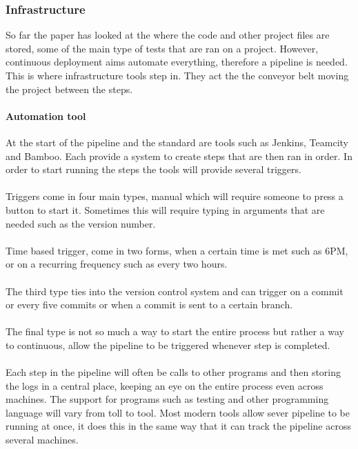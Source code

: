 \subsubsection{Infrastructure}

So far the paper has looked at the where the code and other project files are stored, some of the main type of tests that are ran on a project. However, continuous deployment aims automate everything, therefore a pipeline is needed. This is where infrastructure tools step in. They act the the conveyor belt moving the project between the steps.

\paragraph{Automation tool}
At the start of the pipeline and the standard are tools such as Jenkins, Teamcity and Bamboo. Each provide a system to create steps that are then ran in order. In order to start running the steps the tools will provide several triggers.
\\\\
Triggers come in four main types, manual which will require someone to press a button to start it. Sometimes this will require typing in arguments that are needed such as the version number. 
\\\\
Time based trigger, come in two forms, when a certain time is met such as 6PM, or on a recurring frequency such as every two hours.
\\\\
The third type ties into the version control system and can trigger on a commit or every five commits or when a commit is sent to a certain branch. 
\\\\
The final type is not so much a way to start the entire process but rather a way to continuous, allow the pipeline to be triggered whenever step is completed.
\\\\
Each step in the pipeline will often be calls to other programs and then storing the logs in a central place, keeping an eye on the entire process even across machines. The support for programs such as testing and other programming language will vary from toll  to tool. Most modern tools allow sever pipeline to be running at once, it does this in the same way that  it can track the pipeline across several machines. 
\\\\
